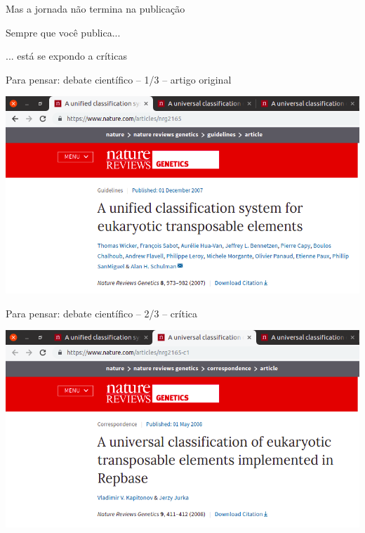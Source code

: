 \documentclass{beamer}
\begin{document}
\begin{frame}
  \begin{center}
    Mas a jornada não termina na publicação

    \vfill
  \end{center}
\end{frame}

\begin{frame}
  \begin{center}
    \Large

    Sempre que você publica...

    \bigskip
    \bigskip
    ... está se expondo a críticas

    \bigskip
    \vfill
  \end{center}
\end{frame}

\begin{frame}{\tiny Para pensar: debate científico -- 1/3 -- artigo original}
  \begin{center}
    \includegraphics[width=\textwidth]{Encerramento/polemica1}
  \end{center}
\end{frame}

\begin{frame}{\tiny Para pensar: debate científico -- 2/3 -- crítica}
  \begin{center}
    \includegraphics[width=\textwidth]{Encerramento/polemica2}
  \end{center}
\end{frame}
\end{document}
